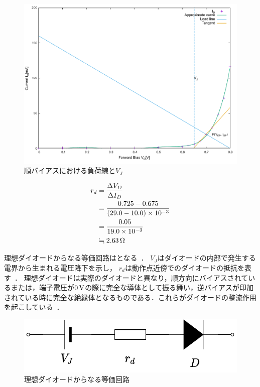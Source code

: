 \begin{enumerate}[(1)]
\begin{figure}[h]
\centering
\includegraphics[scale=0.65]{./data/diode/bias-n-1.pdf}
\caption{順バイアスにおける負荷線と$V_{J}$}
\label{fig:vias-graph-n-1}
\end{figure}
\begin{align}
r_{d}&=\frac{\Delta V_{D}}{\Delta I_{D}}\nonumber \\
&=\frac{0.725-0.675}{(29.0-10.0)\times 10^{-3}}\nonumber \\
&=\frac{0.05}{19.0\times 10^{-3}}\nonumber \\
& \fallingdotseq 2.63\,\rm{\Omega}
\label{eq:rd}
\end{align}

理想ダイオードからなる等価回路はとなる~\cite{adsfcaw}．
$V_{J}$はダイオードの内部で発生する電界から生まれる電圧降下を示し，
$r_{d}$は動作点近傍でのダイオードの抵抗を表す~\cite{sdfvadfcdf}．
理想ダイオードは実際のダイオードと異なり，順方向にバイアスされているまたは，端子電圧が$0\,\rm{V}$の際に完全な導体として振る舞い，逆バイアスが印加されている時に完全な絶縁体となるものである．これらがダイオードの整流作用を起こしている~\cite{adsfcaw}．
	\begin{figure}[h]
	\centering
	\includegraphics[scale=0.5]{./fig/eqc.pdf}
	\caption{理想ダイオードからなる等価回路}
	\label{fig:eqc}
	\end{figure}


\end{enumerate}
